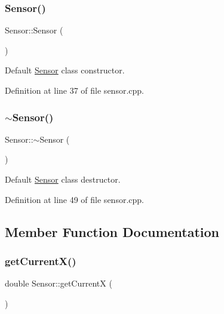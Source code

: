 \subsubsection{\texorpdfstring{Sensor()}{Sensor()}}
{\footnotesize\ttfamily Sensor\+::\+Sensor (\begin{DoxyParamCaption}{ }\end{DoxyParamCaption})}



Default \mbox{\hyperlink{class_sensor}{Sensor}} class constructor. 



Definition at line 37 of file sensor.\+cpp.

\mbox{\label{class_sensor_aee8c70e7ef05ce65e7ee33686b5d7db2}} 
\subsubsection{\texorpdfstring{$\sim$\+Sensor()}{~Sensor()}}
{\footnotesize\ttfamily Sensor\+::$\sim$\+Sensor (\begin{DoxyParamCaption}{ }\end{DoxyParamCaption})}



Default \mbox{\hyperlink{class_sensor}{Sensor}} class destructor. 



Definition at line 49 of file sensor.\+cpp.



\subsection{Member Function Documentation}
\mbox{\label{class_sensor_a933dfb180d498c41862b5e14675cc97d}} 
\subsubsection{\texorpdfstring{get\+Current\+X()}{getCurrentX()}}
{\footnotesize\ttfamily double Sensor\+::get\+CurrentX (\begin{DoxyParamCaption}{ }\end{DoxyParamCaption})}



